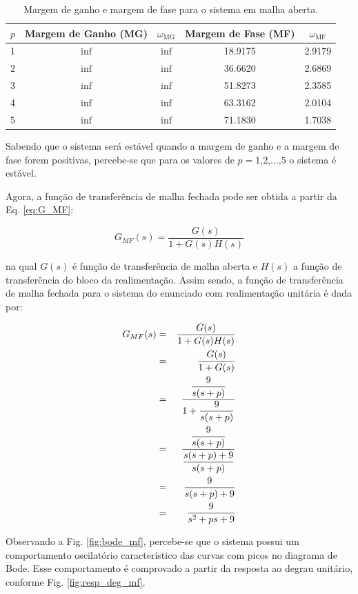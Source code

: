 \begin{table}
\centering
    \caption{Margem de ganho e margem de fase para o sistema em malha aberta.}
    \label{tab:margem_ganho_fase_ma}
\begin{tabular}{|c|c|c|c|c|}
\hline
$p$ & Margem de Ganho (MG) & $\omega_\text{MG}$ & 
Margem de Fase (MF) & $\omega_\text{MF}$\\
\hline
\hline
1 & $\inf$ & $\inf$ & 18.9175 & 2.9179\\
\hline
2 & $\inf$ & $\inf$ & 36.6620 & 2.6869\\
\hline
3 & $\inf$ & $\inf$ & 51.8273 & 2.3585\\
\hline
4 & $\inf$ & $\inf$ & 63.3162 & 2.0104\\
\hline
5 & $\inf$ & $\inf$ & 71.1830 & 1.7038\\
\hline
\end{tabular}
\end{table}

Sabendo que o sistema será estável quando a margem de ganho e a margem de fase
forem positivas, percebe-se que para os valores de $p = 1\text{,} 2\text{,}
\ldots\text{,} 5$ o sistema é estável.

Agora, a função de transferência de malha fechada pode ser obtida a partir da
Eq. \ref{eq:G_MF}:

\begin{equation}\label{eq:G_MF}
G_{MF}(s) = \frac{G(s)}{1+G(s)H(s)}
\end{equation}

\noindent na qual $G(s)$ é função de transferência de malha aberta e $H(s)$ a
função de transferência do bloco da realimentação. Assim sendo, a função de
transferência de malha fechada para o sistema do enunciado com realimentação
unitária é dada por:

\begin{eqnarray}
G_{MF}(s) & = & \frac{G(s)}{1+G(s)H(s)}\nonumber\\
          & = & \frac{G(s)}{1+G(s)}\nonumber\\
          & = & \frac{\displaystyle\frac{9}{s(s+p)}}{1+\displaystyle\frac{9}{s(s+p)}}\nonumber\\
          & = & \frac{\displaystyle\frac{9}{s(s+p)}}{\displaystyle\frac{s(s+p)+9}{s(s+p)}}\nonumber\\
          & = & \frac{9}{s(s+p)+9}\nonumber\\
          & = & \frac{9}{s^2 + ps + 9}\label{eq:G_MF_q1}
\end{eqnarray}

Observando a Fig. \ref{fig:bode_mf}, percebe-se que o sistema possui um
comportamento oscilatório característico das curvas com picos no diagrama de
Bode. Esse comportamento é comprovado a partir da resposta ao degrau unitário,
conforme Fig. \ref{fig:resp_deg_mf}.

